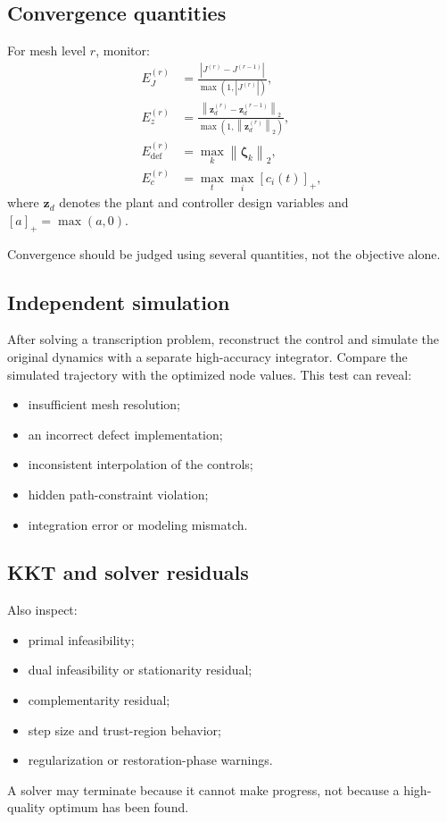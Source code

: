 \documentclass[11pt]{article}
\newcommand{\vect}[1]{\boldsymbol{#1}}
\newcommand{\zvec}{\vect{z}}
\newcommand{\normtwo}[1]{\left\lVert #1 \right\rVert_2}
\begin{document}
\subsection{Convergence quantities}

For mesh level $r$, monitor:
\begin{align}
E_J^{(r)} &=\frac{|J^{(r)}-J^{(r-1)}|}{\max(1,|J^{(r)}|)},\\
E_z^{(r)} &=\frac{\normtwo{\zvec_d^{(r)}-\zvec_d^{(r-1)}}}
{\max(1,\normtwo{\zvec_d^{(r)}})},\\
E_{\mathrm{def}}^{(r)} &=\max_k\normtwo{\vect{\zeta}_k},\\
E_c^{(r)} &=\max_t\max_i\left[c_i(t)\right]_+,
\end{align}
where $\zvec_d$ denotes the plant and controller design variables and $[a]_+=\max(a,0)$.

Convergence should be judged using several quantities, not the objective alone.

\subsection{Independent simulation}

After solving a transcription problem, reconstruct the control and simulate the original dynamics with a separate high-accuracy integrator. Compare the simulated trajectory with the optimized node values. This test can reveal:
\begin{itemize}[leftmargin=1.4em]
  \item insufficient mesh resolution;
  \item an incorrect defect implementation;
  \item inconsistent interpolation of the controls;
  \item hidden path-constraint violation;
  \item integration error or modeling mismatch.
\end{itemize}

\subsection{KKT and solver residuals}

Also inspect:
\begin{itemize}[leftmargin=1.4em]
  \item primal infeasibility;
  \item dual infeasibility or stationarity residual;
  \item complementarity residual;
  \item step size and trust-region behavior;
  \item regularization or restoration-phase warnings.
\end{itemize}
A solver may terminate because it cannot make progress, not because a high-quality optimum has been found.
\end{document}
